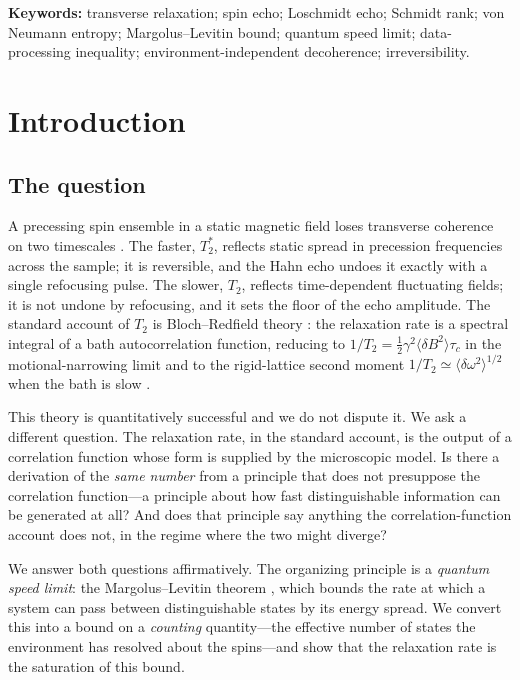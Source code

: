 \documentclass[twocolumn,10pt,a4paper]{article}
\theoremstyle{thmstyle}
\theoremstyle{definition}
\theoremstyle{remark}
\newcommand{\Ttwo}{T_{2}}
\newcommand{\Tstar}{T_{2}^{\ast}}
\begin{document}
\noindent\textbf{Keywords:} transverse relaxation; spin echo; Loschmidt
echo; Schmidt rank; von Neumann entropy; Margolus--Levitin bound; quantum
speed limit; data-processing inequality; environment-independent
decoherence; irreversibility.

\tableofcontents

\section{Introduction}
\label{sec:intro}

\subsection{The question}

A precessing spin ensemble in a static magnetic field loses transverse
coherence on two timescales \citep{bloch1946,abragam1961,slichter1990}.
The faster, $\Tstar$, reflects static spread in precession frequencies
across the sample; it is reversible, and the Hahn echo
\citep{hahn1950} undoes it exactly with a single refocusing pulse. The
slower, $\Ttwo$, reflects time-dependent fluctuating fields; it is not
undone by refocusing, and it sets the floor of the echo amplitude. The
standard account of $\Ttwo$ is Bloch--Redfield theory
\citep{redfield1957,abragam1961}: the relaxation rate is a spectral
integral of a bath autocorrelation function, reducing to
$1/\Ttwo=\tfrac12\gamma^{2}\langle\delta B^{2}\rangle\tau_{c}$ in the
motional-narrowing limit and to the rigid-lattice second moment
$1/\Ttwo\simeq\langle\delta\omega^{2}\rangle^{1/2}$ when the bath is slow
\citep{anderson1953,kubo1962}.

This theory is quantitatively successful and we do not dispute it. We
ask a different question. The relaxation rate, in the standard account,
is the output of a correlation function whose form is supplied by the
microscopic model. Is there a derivation of the \emph{same number} from a
principle that does not presuppose the correlation function---a principle
about how fast distinguishable information can be generated at all? And
does that principle say anything the correlation-function account does
not, in the regime where the two might diverge?

We answer both questions affirmatively. The organizing principle is a
\emph{quantum speed limit}: the Margolus--Levitin theorem
\citep{margolus1998,mandelstam1945,deffner2017}, which bounds the rate at
which a system can pass between distinguishable states by its energy
spread. We convert this into a bound on a \emph{counting} quantity---the
effective number of states the environment has resolved about the
spins---and show that the relaxation rate is the saturation of this
bound.
\end{document}
